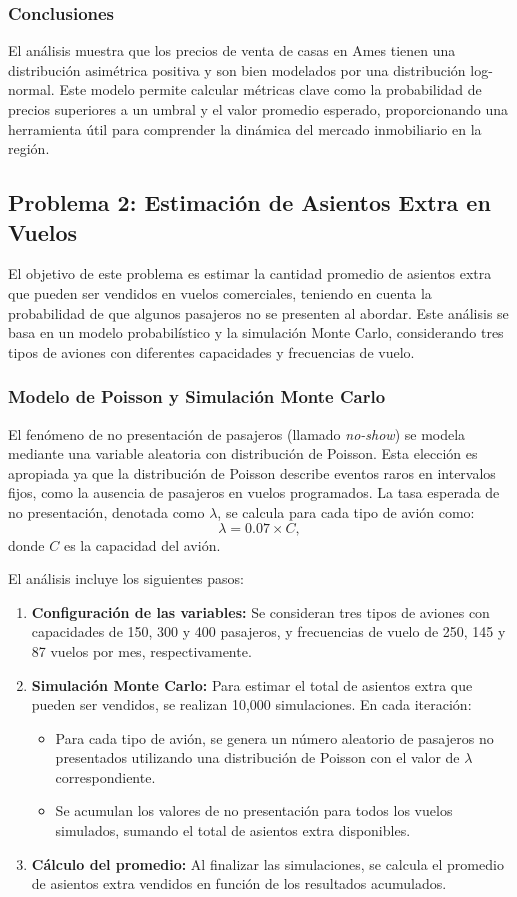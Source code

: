 \documentclass[12pt]{article}
\begin{document}
\subsubsection*{Conclusiones}
El análisis muestra que los precios de venta de casas en Ames tienen una distribución asimétrica positiva y son bien modelados por una distribución log-normal. Este modelo permite calcular métricas clave como la probabilidad de precios superiores a un umbral y el valor promedio esperado, proporcionando una herramienta útil para comprender la dinámica del mercado inmobiliario en la región.



\subsection{Problema 2: Estimación de Asientos Extra en Vuelos}
El objetivo de este problema es estimar la cantidad promedio de asientos extra que pueden ser vendidos en vuelos comerciales, teniendo en cuenta la probabilidad de que algunos pasajeros no se presenten al abordar. Este análisis se basa en un modelo probabilístico y la simulación Monte Carlo, considerando tres tipos de aviones con diferentes capacidades y frecuencias de vuelo.

\subsubsection{Modelo de Poisson y Simulación Monte Carlo}
El fenómeno de no presentación de pasajeros (llamado \textit{no-show}) se modela mediante una variable aleatoria con distribución de Poisson. Esta elección es apropiada ya que la distribución de Poisson describe eventos raros en intervalos fijos, como la ausencia de pasajeros en vuelos programados. La tasa esperada de no presentación, denotada como $\lambda$, se calcula para cada tipo de avión como:
\[
\lambda = 0.07 \times C,
\]
donde $C$ es la capacidad del avión.

El análisis incluye los siguientes pasos:
\begin{enumerate}
    \item \textbf{Configuración de las variables:} Se consideran tres tipos de aviones con capacidades de 150, 300 y 400 pasajeros, y frecuencias de vuelo de 250, 145 y 87 vuelos por mes, respectivamente.
    \item \textbf{Simulación Monte Carlo:} Para estimar el total de asientos extra que pueden ser vendidos, se realizan 10,000 simulaciones. En cada iteración:
    \begin{itemize}
        \item Para cada tipo de avión, se genera un número aleatorio de pasajeros no presentados utilizando una distribución de Poisson con el valor de $\lambda$ correspondiente.
        \item Se acumulan los valores de no presentación para todos los vuelos simulados, sumando el total de asientos extra disponibles.
    \end{itemize}
    \item \textbf{Cálculo del promedio:} Al finalizar las simulaciones, se calcula el promedio de asientos extra vendidos en función de los resultados acumulados.
\end{enumerate}
\end{document}
